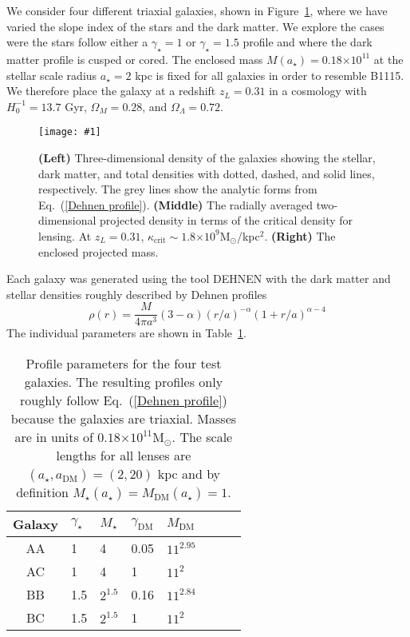 \documentclass[onecolumn,galley]{mn2e}
\newcommand{\Msun}{\ensuremath{\mathrm{M}_\odot}}
\newcommand{\tabref}[1] {Table~\ref{#1}}
\newcommand{\figref}[1] {Figure~\ref{#1}}
\newcommand{\eqnref}[1] {Eq.~(\ref{#1})}
\newcommand{\e}[1]{\ensuremath{\times 10^{#1}}}
\newcommand\plotone[1]{%
 \centering
 \leavevmode
 \texttt{[image: \#1]}%
}%
\begin{document}
We consider four different triaxial galaxies, shown in \figref{test galaxies},
where we have varied the slope index of the stars and the dark matter. We
explore the cases were the stars follow either a $\gamma_\star=1$ or
$\gamma_\star=1.5$ profile and where the dark matter profile is cusped or
cored. The enclosed mass $M(a_\star)= 0.18\e{11}$ at the stellar scale
radius $a_\star=2$ kpc is fixed for all galaxies in order to resemble B1115. We
therefore place the galaxy at a redshift $z_L = 0.31$ in a cosmology with
$H_0^{-1}=13.7$ Gyr, $\Omega_M=0.28$, and $\Omega_\Lambda=0.72$.

\begin{figure}
\plotone{cmp_simulations.pdf}
\caption{
\textbf{(Left)} 
Three-dimensional density of the galaxies showing the stellar, dark matter,
and total densities with dotted, dashed, and solid lines, respectively. The
grey lines show the analytic forms from \eqnref{Dehnen profile}. 
\textbf{(Middle)} 
The radially averaged two-dimensional projected density in terms of the
critical density for lensing. At $z_L=0.31$, $\kappa_\mathrm{crit}\sim 1.8\e{9}$\Msun/kpc$^2$.
\textbf{(Right)}
The enclosed projected mass.
}
\label{test galaxies}
\end{figure}


Each galaxy was generated using the tool DEHNEN with the dark matter and stellar
densities roughly described by Dehnen profiles
%
\begin{equation}
\rho(r) = \frac{M}{4\pi a^3}(3-\alpha){(r/a)^{-\alpha}(1 + r/a)^{\alpha-4}}
\label{Dehnen profile}
\end{equation}
%
The individual parameters are shown in \tabref{Lens profile params}. 

\begin{table}
\begin{tabular}{clllllll}
Galaxy & $\gamma_\star$ & $M_\star$ & $\gamma_\mathrm{DM}$ & $M_\mathrm{DM}$ \\
\hline
AA & 1 & 4 & 0.05 & $11^{2.95}$ \\
AC & 1 & 4 & 1 & $11^2$ \\
BB & 1.5 & $2^{1.5}$ & 0.16 & $11^{2.84}$ \\
BC & 1.5 & $2^{1.5}$ & 1 & $11^2$
\end{tabular}
\caption{Profile parameters for the four test galaxies. The resulting profiles only roughly follow
\eqnref{Dehnen profile} because the galaxies are triaxial. Masses are in units of $0.18\e{11}\Msun$. The scale lengths for
all lenses are $(a_\star,a_\mathrm{DM})=(2,20)$ kpc and by definition
$M_\star(a_\star) = M_\mathrm{DM}(a_\star) = 1$.}
\label{Lens profile params}
\end{table}
\end{document}

